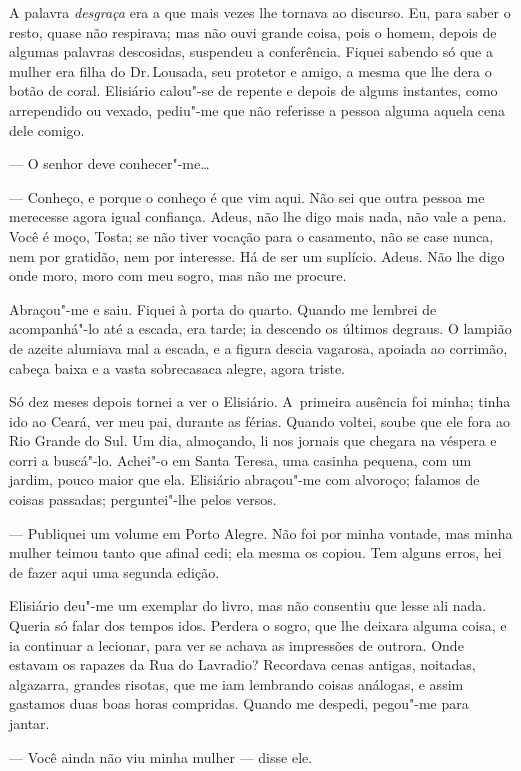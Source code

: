 \begin{linenumbers}
A palavra \emph{desgraça} era a que mais vezes lhe tornava ao discurso.
Eu, para saber o resto, quase não respirava; mas não ouvi grande coisa,
pois o homem, depois de algumas palavras descosidas, suspendeu a
conferência. Fiquei sabendo só que a mulher era filha do Dr.\,Lousada,
seu protetor e amigo, a mesma que lhe dera o botão de coral. Elisiário
calou"-se de repente e depois de alguns instantes, como arrependido ou
vexado, pediu"-me que não referisse a pessoa alguma aquela cena dele
comigo.

--- O senhor deve conhecer"-me\ldots{}

--- Conheço, e porque o conheço é que vim aqui. Não sei que outra pessoa
me merecesse agora igual confiança. Adeus, não lhe digo mais nada, não
vale a pena. Você é moço, Tosta; se não tiver vocação para o casamento,
não se case nunca, nem por gratidão, nem por interesse. Há de ser um
suplício. Adeus. Não lhe digo onde moro, moro com meu sogro, mas não me
procure.

Abraçou"-me e saiu. Fiquei à porta do quarto. Quando me lembrei de
acompanhá"-lo até a escada, era tarde; ia descendo os últimos degraus. O
lampião de azeite alumiava mal a escada, e a figura descia vagarosa,
apoiada ao corrimão, cabeça baixa e a vasta sobrecasaca alegre, agora
triste.

Só dez meses depois tornei a ver o Elisiário. A~primeira ausência foi
minha; tinha ido ao Ceará, ver meu pai, durante as férias. Quando
voltei, soube que ele fora ao Rio Grande do Sul. Um dia, almoçando, li
nos jornais que chegara na véspera e corri a buscá"-lo. Achei"-o em Santa
Teresa, uma casinha pequena, com um jardim, pouco maior que ela.
Elisiário abraçou"-me com alvoroço; falamos de coisas passadas;
perguntei"-lhe pelos versos.

--- Publiquei um volume em Porto Alegre. Não foi por minha vontade, mas
minha mulher teimou tanto que afinal cedi; ela mesma os copiou. Tem
alguns erros, hei de fazer aqui uma segunda edição.

Elisiário deu"-me um exemplar do livro, mas não consentiu que lesse ali
nada. Queria só falar dos tempos idos. Perdera o sogro, que lhe deixara
alguma coisa, e ia continuar a lecionar, para ver se achava as
impressões de outrora. Onde estavam os rapazes da Rua do Lavradio?
Recordava cenas antigas, noitadas, algazarra, grandes risotas, que me
iam lembrando coisas análogas, e assim gastamos duas boas horas
compridas. Quando me despedi, pegou"-me para jantar.

--- Você ainda não viu minha mulher --- disse ele. 


\end{linenumbers}
